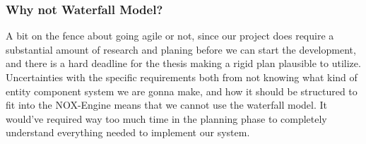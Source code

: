 \subsubsection{Why not Waterfall Model?}
A bit on the fence about going agile or not, since our project does require a substantial amount of research and planing before we can start the development, 
and there is a hard deadline for the thesis making a rigid plan plausible to utilize. 
Uncertainties with the specific requirements both from not knowing what kind of entity component system we are gonna make, 
and how it should be structured to fit into the NOX-Engine means that we cannot use the waterfall model.
It would've required way too much time in the planning phase to completely understand everything needed to implement our system.